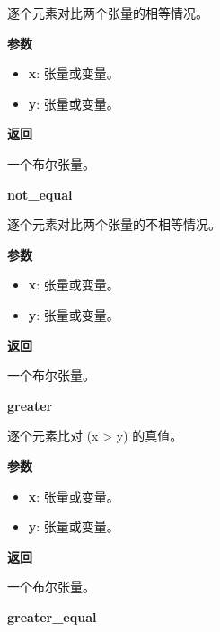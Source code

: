 逐个元素对比两个张量的相等情况。

\textbf{参数}

\begin{itemize}
\tightlist
\item
  \textbf{x}: 张量或变量。
\item
  \textbf{y}: 张量或变量。
\end{itemize}

\textbf{返回}

一个布尔张量。


\textbf{not\_equal}\label{notux5fequal}

\begin{Shaded}
\begin{Highlighting}[]
\end{Highlighting}
\end{Shaded}

逐个元素对比两个张量的不相等情况。

\textbf{参数}

\begin{itemize}
\tightlist
\item
  \textbf{x}: 张量或变量。
\item
  \textbf{y}: 张量或变量。
\end{itemize}

\textbf{返回}

一个布尔张量。


\textbf{greater}\label{greater}

\begin{Shaded}
\begin{Highlighting}[]
\end{Highlighting}
\end{Shaded}

逐个元素比对 (x \textgreater{} y) 的真值。

\textbf{参数}

\begin{itemize}
\tightlist
\item
  \textbf{x}: 张量或变量。
\item
  \textbf{y}: 张量或变量。
\end{itemize}

\textbf{返回}

一个布尔张量。


\textbf{greater\_equal}\label{greaterux5fequal}

\begin{Shaded}
\begin{Highlighting}[]
\end{Highlighting}
\end{Shaded}


